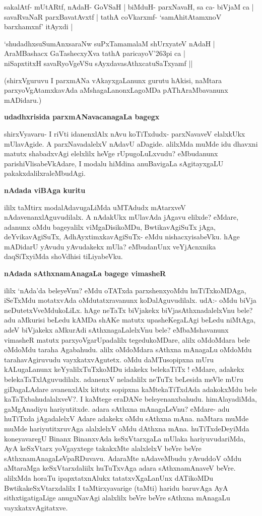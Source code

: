 sakalAtf- mUtARtf, nAdaH- GoVSaH | biMduH- parxNavaH, sa ca- biVjaM ca | savaRvaNaR parxBavatAvxtf | tathA coVkarxmf- `samAhitAtamxnoV barxhamxnf' itAyxdi |

\begin{shloka}
`shudadhxsuSumAnxsaraNw suPxTamamalaM shUrxyateV nAdaH |\\
AraMBashacx GaTashecxyXva tathA paricayoV\char'263pi ca |\\
niSapxtitxH savaRyoVgeVSu sAyxdavasAthxcatuSaTxyamf ||
\end{shloka}

(shirxVguruvu I parxmANa vAkayxgaLanunx gurutu hAkisi, naMtara parxyoVgAtamxkavAda aMshagaLanonxLagoMDa pAThAraMbavanunx mADidaru.)

{\bf udadhxrisida parxmANavacanagaLa bagegx}

shirxVyavaru- I riVti idanenxlAlx nAvu koTiTxdudx- parxNavaveV elalxkUkx mUlavAgide. A parxNavadalelxV nAdavU aDagide. alilxMda muMde idu dhavxni matutx shabadxvAgi elelxlilx heVge rUpugoLuLxvudu? eMbudanunx parishiVlisabeVkAdare, I modalu hiMdina anuBavigaLa sAgitayxgaLU pakakxdalilxraleMbudAgi.

{\bf nAdada viBAga kuritu}

ililx taMtirx modalAdavugaLiMda uMTAdudx mAtarxveV nAdavenanxlAguvudilalx. A nAdakUkx mUlavAda jAgavu elilxde? eMdare, adanunx oMdu bageyalilx viMgaDisikoMDu, BwtikavAgiSuTx jAga, deYvikavAgiSuTx, AdhAyxtimxkavAgiSuTx- eMdu nishacxyisabeVku. hAge mADidarU yAvudu yAvudakekx mUla? eMbudanUnx veYjAcnxnika daqSiTxyiMda shoVdhisi tiLiyabeVku.

{\bf nAdada sAthxnamAnagaLa bagege vimasheR}

ililx `nAda'da beleyeVnu? eMdu oTATxda parxshenxyoMdu huTiTxkoMDAga, iSeTxMdu motatxvAda oMdutatxravanunx koDalAguvudilalx. udA:- oMdu biVja neDutetxVveMdukoLiLx. hAge neTaTx biVjakekx biVjasAthxnadalelxVnu bele? adu aMkurisi beLedu kAMDa shAKe matutx upasheKegaLAgi beLedu niMtAga, adeV biVjakekx aMkurAdi sAthxnagaLalelxVnu bele? eMbaMshavanunx vimasheR matutx parxyoVgarUpadalilx tegedukoMDare, alilx oMdoMdara bele oMdoMdu taraha Agabahudu. alilx oMdoMdara sAthxna mAnagaLu oMdoMdu tarahavAgiruvudu vayxkatxvAgutetx. oMdu daMTusopipxna mUru kALugaLanunx keYyalilxTuTxkoMDu idakekx belekaTiTx ! eMdare, adakekx belekaTaTxlAguvudilalx. adanenxV neladalilx neTuTx beLesida meVle mUru giDagaLAdare avanenxlAlx kitutx sopipxna kaMtekaTiTxdAda adakokxMdu bele kaTaTxbahudalalxveV?. I kaMtege eraDANe beleyenanxbahudu. himAlayadiMda, gaMgAnadiyu hariyutitxde. adara sAthxna mAnagaLeVnu? eMdare- adu huTiTxda jAgadalelxV Adare adakekx oMdu sAthxna mAna. naMtara muMde muMde hariyutitxruvAga alalxlelxV oMdu dAthxna mAna. huTiTxdeDeyiMda koneyavaregU Binanx BinanxvAda keSxVtarxgaLa mUlaka hariyuvudariMda, AyA keSxVtarx yoVgayxtege takakxMte alalxlelxV beVre beVre sAthxnamAnagaLeVpaRDuvavu. AdaraMte nAdaveMbudu yAvuddoV oMdu aMtaraMga keSxVtarxdaliilx huTuTxvAga adara sAthxnamAnaveV beVre. alilxMda horaTu ipapxtatxnAlukx tatatxvXgaLanUnx dATikoMDu BwtikakeSxVtarxdalilx I taMtirxyavarige (taMti) haridu baruvAga AyA sithxtigatigaLige anuguNavAgi alalxlilx beVre beVre sAthxna mAnagaLu vayxkatxvAgitatxve.


